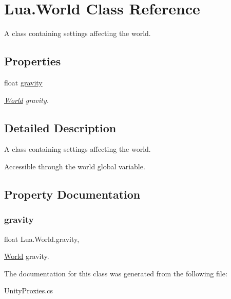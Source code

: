 \hypertarget{class_lua_1_1_world}{}\section{Lua.\+World Class Reference}
\label{class_lua_1_1_world}


A class containing settings affecting the world.  


\subsection*{Properties}
\begin{DoxyCompactItemize}
\item 
float \mbox{\hyperlink{class_lua_1_1_world_a22ab3b01f22a00741c9b11a1f32ff7db}{gravity}}
\begin{DoxyCompactList}\small\item\em \mbox{\hyperlink{class_lua_1_1_world}{World}} gravity. \end{DoxyCompactList}\end{DoxyCompactItemize}


\subsection{Detailed Description}
A class containing settings affecting the world. 

Accessible through the {\ttfamily world} global variable. 

\subsection{Property Documentation}
\mbox{\label{class_lua_1_1_world_a22ab3b01f22a00741c9b11a1f32ff7db}} 
\subsubsection{\texorpdfstring{gravity}{gravity}}
{\footnotesize\ttfamily float Lua.\+World.\+gravity\hspace{0.3cm}{\ttfamily [get]}, {\ttfamily [set]}}



\mbox{\hyperlink{class_lua_1_1_world}{World}} gravity. 



The documentation for this class was generated from the following file\+:\begin{DoxyCompactItemize}
\item 
Unity\+Proxies.\+cs\end{DoxyCompactItemize}
